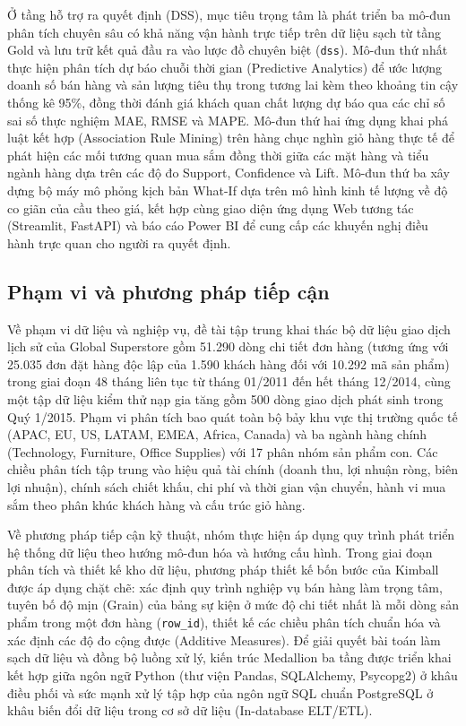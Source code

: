 Ở tầng hỗ trợ ra quyết định (DSS), mục tiêu trọng tâm là phát triển ba mô-đun phân tích chuyên sâu có khả năng vận hành trực tiếp trên dữ liệu sạch từ tầng Gold và lưu trữ kết quả đầu ra vào lược đồ chuyên biệt (\texttt{dss}). Mô-đun thứ nhất thực hiện phân tích dự báo chuỗi thời gian (Predictive Analytics) để ước lượng doanh số bán hàng và sản lượng tiêu thụ trong tương lai kèm theo khoảng tin cậy thống kê 95\%, đồng thời đánh giá khách quan chất lượng dự báo qua các chỉ số sai số thực nghiệm MAE, RMSE và MAPE. Mô-đun thứ hai ứng dụng khai phá luật kết hợp (Association Rule Mining) trên hàng chục nghìn giỏ hàng thực tế để phát hiện các mối tương quan mua sắm đồng thời giữa các mặt hàng và tiểu ngành hàng dựa trên các độ đo Support, Confidence và Lift. Mô-đun thứ ba xây dựng bộ máy mô phỏng kịch bản What-If dựa trên mô hình kinh tế lượng về độ co giãn của cầu theo giá, kết hợp cùng giao diện ứng dụng Web tương tác (Streamlit, FastAPI) và báo cáo Power BI để cung cấp các khuyến nghị điều hành trực quan cho người ra quyết định.

\subsection{Phạm vi và phương pháp tiếp cận}

Về phạm vi dữ liệu và nghiệp vụ, đề tài tập trung khai thác bộ dữ liệu giao dịch lịch sử của Global Superstore gồm 51.290 dòng chi tiết đơn hàng (tương ứng với 25.035 đơn đặt hàng độc lập của 1.590 khách hàng đối với 10.292 mã sản phẩm) trong giai đoạn 48 tháng liên tục từ tháng 01/2011 đến hết tháng 12/2014, cùng một tập dữ liệu kiểm thử nạp gia tăng gồm 500 dòng giao dịch phát sinh trong Quý 1/2015. Phạm vi phân tích bao quát toàn bộ bảy khu vực thị trường quốc tế (APAC, EU, US, LATAM, EMEA, Africa, Canada) và ba ngành hàng chính (Technology, Furniture, Office Supplies) với 17 phân nhóm sản phẩm con. Các chiều phân tích tập trung vào hiệu quả tài chính (doanh thu, lợi nhuận ròng, biên lợi nhuận), chính sách chiết khấu, chi phí và thời gian vận chuyển, hành vi mua sắm theo phân khúc khách hàng và cấu trúc giỏ hàng.

Về phương pháp tiếp cận kỹ thuật, nhóm thực hiện áp dụng quy trình phát triển hệ thống dữ liệu theo hướng mô-đun hóa và hướng cấu hình. Trong giai đoạn phân tích và thiết kế kho dữ liệu, phương pháp thiết kế bốn bước của Kimball được áp dụng chặt chẽ: xác định quy trình nghiệp vụ bán hàng làm trọng tâm, tuyên bố độ mịn (Grain) của bảng sự kiện ở mức độ chi tiết nhất là mỗi dòng sản phẩm trong một đơn hàng (\texttt{row\_id}), thiết kế các chiều phân tích chuẩn hóa và xác định các độ đo cộng được (Additive Measures). Để giải quyết bài toán làm sạch dữ liệu và đồng bộ luồng xử lý, kiến trúc Medallion ba tầng được triển khai kết hợp giữa ngôn ngữ Python (thư viện Pandas, SQLAlchemy, Psycopg2) ở khâu điều phối và sức mạnh xử lý tập hợp của ngôn ngữ SQL chuẩn PostgreSQL ở khâu biến đổi dữ liệu trong cơ sở dữ liệu (In-database ELT/ETL).

